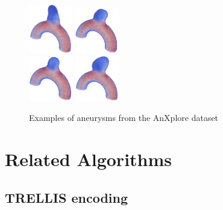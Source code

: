 \documentclass[%
 reprint,
 amsmath,amssymb,
 aps,
 floatfix,
 nofootinbib,
]{revtex4-2}
\begin{document}
\begin{figure}[h]
  \centering
  \includegraphics[width=0.17\textwidth]{aneu-axplore_1.png}\hspace{0.7em}
  \includegraphics[width=0.17\textwidth]{aneu-axplore_2.png}\\[0.7em]
  \includegraphics[width=0.17\textwidth]{aneu-axplore_3.png}\hspace{0.7em}
  \includegraphics[width=0.17\textwidth]{aneu-axplore_4.png}
  \caption{Examples of aneurysms from the AnXplore dataset}
  \label{fig:anxplore_aneurysms}
\end{figure}

\section{Related Algorithms} \label{RELATED}

\subsection{TRELLIS encoding}
\end{document}
